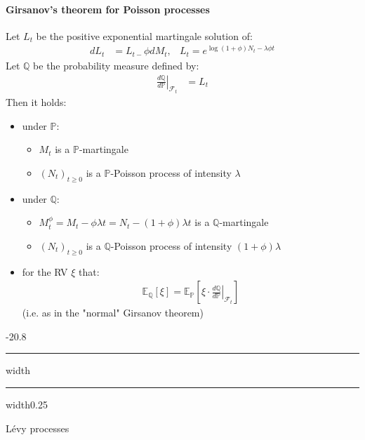 \documentclass[a4paper,landscape,8pt,fleqn]{scrartcl}
\makeatletter
\renewcommand{\subsection}{\@startsection{subsection}{1}{0mm}%
{-2\baselineskip}{0.8\baselineskip}%
{\hrule depth 0.2pt width\columnwidth\hrule depth0.75pt
width0.25\columnwidth\vspace*{1.2em}\large\bfseries}}
\makeatother
\begin{document}
\begin{multicols*}{4}
\paragraph{Girsanov's theorem for Poisson processes}
Let $L_t$ be the positive exponential martingale solution of:
\begin{align*}
dL_t &= L_{t-} \phi dM_t, & L_t = e^{\log(1+\phi)N_t - \lambda \phi t}
\end{align*}
Let $\mathbb{Q}$ be the probability measure defined by:
\begin{align*}
\left. \frac{d\mathbb{Q}}{d\mathbb{P}} \right|_{\mathcal{F}_t} &= L_t
\end{align*}
Then it holds:
\begin{itemize}
\item under $\mathbb{P}$:
\begin{itemize}
\item $M_t$ is a $\mathbb{P}$-martingale
\item $(N_t)_{t \geq 0}$ is a $\mathbb{P}$-Poisson process of intensity $\lambda$
\end{itemize}
\item under $\mathbb{Q}$:
\begin{itemize}
\item $M_t^\phi = M_t - \phi \lambda t = N_t - (1+\phi) \lambda t$ is a $\mathbb{Q}$-martingale
\item $(N_t)_{t \geq 0}$ is a $\mathbb{Q}$-Poisson process of intensity $(1+\phi)\lambda$
\end{itemize}
\item for the RV $\xi$ that:
\begin{align*}
\mathbb{E}_\mathbb{Q}[\xi] = \mathbb{E}_\mathbb{P}\left[ \xi \cdot \left. \frac{d\mathbb{Q}}{d\mathbb{P}} \right|_{\mathcal{F}_t} \right]
\end{align*}
(i.e. as in the "normal" Girsanov theorem)
\end{itemize}

\subsection{Lévy processes}


\end{multicols*}
\end{document}
